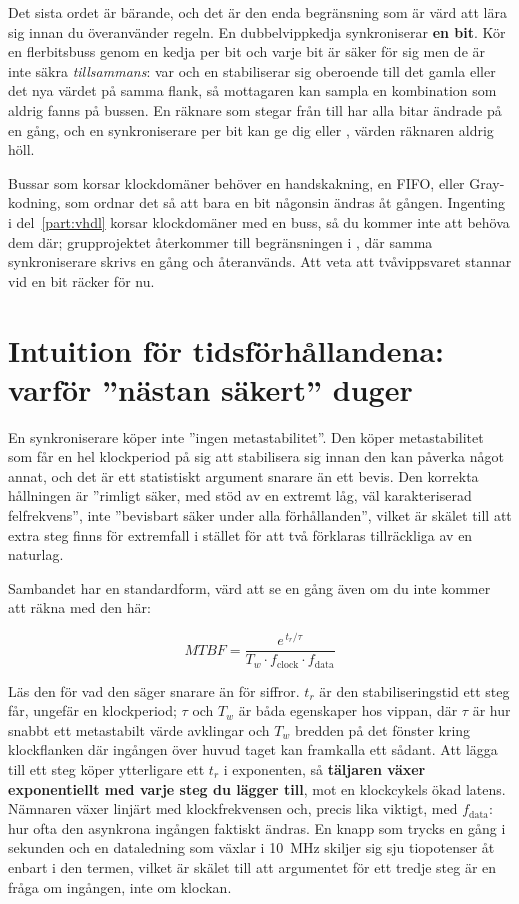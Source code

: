 \begin{warning}
Det sista ordet är bärande, och det är den enda begränsning som är värd att lära sig innan du
överanvänder regeln. En dubbelvippkedja synkroniserar \textbf{en bit}. Kör en flerbitsbuss genom
en kedja per bit och varje bit är säker för sig men de är inte säkra \emph{tillsammans}: var och en
stabiliserar sig oberoende till det gamla eller det nya värdet på samma flank, så mottagaren kan
sampla en kombination som aldrig fanns på bussen. En räknare som stegar från  till
 har alla bitar ändrade på en gång, och en synkroniserare per bit kan ge dig
 eller , värden räknaren aldrig höll.

Bussar som korsar klockdomäner behöver en handskakning, en FIFO, eller Gray-kodning, som ordnar det
så att bara en bit någonsin ändras åt gången. Ingenting i del~\ref{part:vhdl} korsar klockdomäner
med en buss, så du kommer inte att behöva dem där; grupprojektet återkommer till begränsningen i
, där samma synkroniserare skrivs en gång och återanvänds. Att veta att
tvåvippsvaret stannar vid en bit räcker för nu.
\end{warning}

\section{Intuition för tidsförhållandena: varför ”nästan säkert” duger}
\label{c4:sec:mtbf}

En synkroniserare köper inte ”ingen metastabilitet”. Den köper metastabilitet som får en hel
klockperiod på sig att stabilisera sig innan den kan påverka något annat, och det är ett
statistiskt argument snarare än ett bevis. Den korrekta hållningen är ”rimligt säker, med stöd av
en extremt låg, väl karakteriserad felfrekvens”, inte ”bevisbart säker under alla förhållanden”,
vilket är skälet till att extra steg finns för extremfall i stället för att två förklaras
tillräckliga av en naturlag.

Sambandet har en standardform, värd att se en gång även om du inte kommer att räkna med den här:

\[ \mathit{MTBF} = \frac{e^{\,t_r / \tau}}{T_w \cdot f_{\mathrm{clock}} \cdot f_{\mathrm{data}}} \]

Läs den för vad den säger snarare än för siffror. $t_r$ är den stabiliseringstid ett steg får,
ungefär en klockperiod; $\tau$ och $T_w$ är båda egenskaper hos vippan, där $\tau$ är hur snabbt
ett metastabilt värde avklingar och $T_w$ bredden på det fönster kring klockflanken där ingången
över huvud taget kan framkalla ett sådant. Att lägga till ett steg köper ytterligare ett $t_r$ i
exponenten, så \textbf{täljaren växer exponentiellt med varje steg du lägger till}, mot en
klockcykels ökad latens. Nämnaren växer linjärt med klockfrekvensen och, precis lika viktigt, med
$f_{\mathrm{data}}$: hur ofta den asynkrona ingången faktiskt ändras. En knapp som trycks en gång i
sekunden och en dataledning som växlar i 10~MHz skiljer sig sju tiopotenser åt enbart i den termen,
vilket är skälet till att argumentet för ett tredje steg är en fråga om ingången, inte om klockan.

